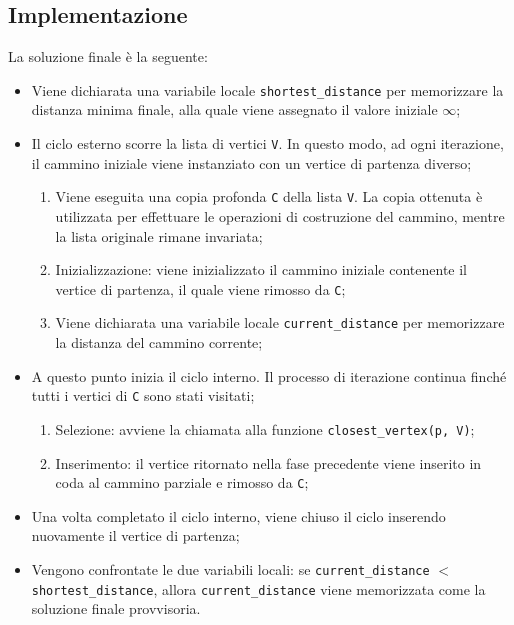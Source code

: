 \subsection{Implementazione}
 La soluzione finale è la seguente:
\begin{itemize}
	\item Viene dichiarata una variabile locale \texttt{shortest\_distance} per memorizzare la distanza minima finale, alla quale viene assegnato il valore iniziale $\infty$;
	\item Il ciclo esterno scorre la lista di vertici \texttt{V}. In questo modo, ad ogni iterazione, il cammino iniziale viene instanziato con un vertice di partenza diverso; 
	\begin{enumerate}
		\item Viene eseguita una copia profonda \texttt{C} della lista \texttt{V}. La copia ottenuta è utilizzata per effettuare le operazioni di costruzione del cammino, mentre la lista originale rimane invariata;
		\item Inizializzazione: viene inizializzato il cammino iniziale contenente il vertice di partenza, il quale viene rimosso da \texttt{C};
		\item Viene dichiarata una variabile locale \texttt{current\_distance} per memorizzare la distanza del cammino corrente;
	\end{enumerate}
	\item A questo punto inizia il ciclo interno. Il processo di iterazione continua finché tutti i vertici di \texttt{C} sono stati visitati;
	\begin{enumerate}
		\item Selezione: avviene la chiamata alla funzione \texttt{closest\_vertex(p, V)};
		\item Inserimento: il vertice ritornato nella fase precedente viene inserito in coda al cammino parziale e rimosso da \texttt{C};
	\end{enumerate}  
	\item Una volta completato il ciclo interno, viene chiuso il ciclo inserendo nuovamente il vertice di partenza;
	\item Vengono confrontate le due variabili locali: se \texttt{current\_distance} $<$ \texttt{shortest\_distance}, allora \texttt{current\_distance} viene memorizzata come la soluzione finale provvisoria.
\end{itemize}
\pagebreak